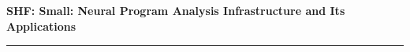 \documentclass[11pt]{article}
\begin{document}
\begin{center}


{\large \bf SHF: Small: Neural Program Analysis Infrastructure and Its Applications}
\end{center}
\vspace{-.1in}
\hrule

%

%


%
%
%


%


%
%


\newpage
\setcounter{page}{1}




%
\end{document}
